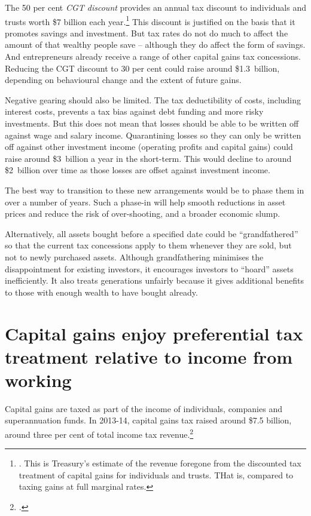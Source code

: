 \documentclass{grattan}\usepackage[]{graphicx}\usepackage[]{color}
\newcommand{\highlight}[1]{\emph{#1}}
\begin{document}
The 50 per cent \highlight{CGT discount} provides an annual tax discount to individuals and trusts worth \$7 billion each year.\footnote{\textcite[p.4-21]{Treasury2015a}. This is Treasury's estimate of the revenue foregone from the discounted tax treatment of capital gains for individuals and trusts. THat is, compared to taxing gains at full marginal rates.} This discount is justified on the basis that it promotes savings and investment. But tax rates do not do much to affect the amount of that wealthy people save -- although they do affect the form of savings. And entrepreneurs already receive a range of other capital gains tax concessions. Reducing the CGT discount to 30 per cent could raise around \$1.3~billion, depending on behavioural change and the extent of future gains.

Negative gearing should also be limited. The tax deductibility of costs, including interest costs, prevents a tax bias against debt funding and more risky investments. But this does not mean that losses should be able to be written off against wage and salary income. Quarantining losses so they can only be written off against other investment income (operating profits and capital gains) could raise around \$3~billion a year in the short-term. This would decline to around \$2~billion over time as those losses are offset against investment income.  

The best way to transition to these new arrangements would be to phase them in over a number of years. Such a phase-in will help smooth reductions in asset prices and reduce the risk of over-shooting, and a broader economic slump. 

Alternatively, all assets bought before a specified date could be ``grandfathered'' so that the current tax concessions apply to them whenever they are sold, but not to newly purchased assets. Although grandfathering minimises the disappointment for existing investors, it encourages investors to ``hoard'' assets inefficiently. It also treats generations unfairly because it gives additional benefits to those with enough wealth to have bought already.

\section{Capital gains enjoy preferential tax treatment relative to income from working}
Capital gains are taxed as part of the income of individuals, companies and superannuation funds. In 2013-14, capital gains tax raised around \$7.5 billion, around three per cent of total income tax revenue.\footcite{Treasury2014a} 
\end{document}
